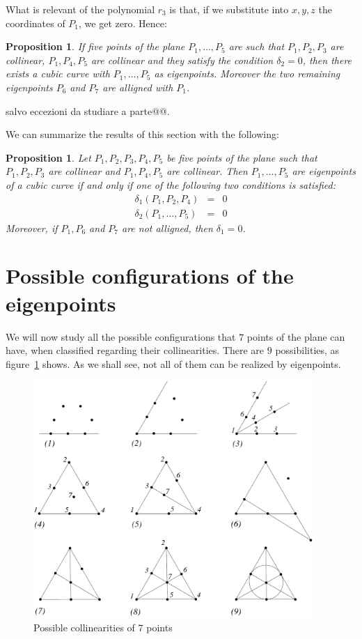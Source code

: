 \documentclass{amsart}
\theoremstyle{plain}
\newtheorem{prop}[theorem]{Proposition}
\theoremstyle{definition}
\begin{document}
What is relevant of the polynomial $r_3$ is that, if we substitute into
$x, y, z$ the coordinates of $P_1$, we get zero. Hence:


\begin{prop}
If five points of the plane $P_1, \dots , P_5$
are such that $P_1, P_2, P_3$ are collinear,
$P_1, P_4, P_5$ are collinear and they satisfy the condition
$\delta_2 =0$, then there exists a cubic curve with $P_1, \dots, P_5$
as eigenpoints. Moreover the two remaining eigenpoints $P_6$ and $P_7$
are alligned with $P_1$.
\label{propX}
\end{prop}
salvo eccezioni da studiare a parte@@.


We can summarize the results of this section with the following:

\begin{prop}
  Let $P_1, P_2, P_3, P_4, P_5$ be five points of the plane such that
  $P_1, P_2, P_3$ are collinear and $P_1, P_4, P_5$ are collinear. Then
  $P_1, \dots, P_5$ are eigenpoints of a cubic curve if and only if
  one of the following two conditions is satisfied:
  \begin{eqnarray*}
    \delta_1(P_1, P_2, P_4) & = & 0\\
    \delta_2(P_1, \dots, P_5) & = & 0
  \end{eqnarray*}
  Moreover, if $P_1, P_6$ and $P_7$ are not alligned, then $\delta_1=0$.
  \label{freccia}
\end{prop}


\section{Possible configurations of the eigenpoints}

We will now study all the possible configurations that $7$ points of the
plane can have, when classified regarding their collinearities. There are
$9$ possibilities, as figure~\ref{collin} shows. As we shall see,
not all of them can be realized by eigenpoints. 

\begin{figure}
\includegraphics[height=9cm]{noveConfB.pdf}
\caption{Possible collinearities of $7$ points
\label{collin}}
\end{figure}
\end{document}
